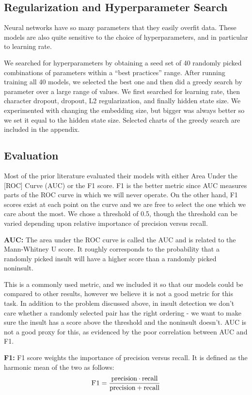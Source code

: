 \documentclass{article} %
\begin{document}
\subsection*{Regularization and Hyperparameter Search}
Neural networks have so many parameters that they easily overfit data. These models are also quite sensitive to the choice of hyperparameters, and in particular to learning rate. 

We searched for hyperparameters by obtaining a seed set of 40 randomly picked combinations of parameters within a ``best practices'' range. After running training all 40 models, we selected the best one and then did a greedy search by parameter over a large range of values. We first searched for learning rate, then character dropout, dropout, L2 regularization, and finally hidden state size. We experimented with changing the embedding size, but bigger was always better so we set it equal to the hidden state size. Selected charts of the greedy search are included in the appendix.


\subsection*{Evaluation}
Most of the prior literature evaluated their models with either Area Under the [ROC] Curve (AUC) or the F1 score. F1 is the better metric since AUC measures parts of the ROC curve in which we will never operate. On the other hand, F1 scores exist at each point on the curve and we are free to select the one which we care about the most. We chose a threshold of 0.5, though the threshold can be varied depending upon relative importance of precision versus recall. 

\textbf{AUC:}
The area under the ROC curve is called the AUC and is related to the Mann-Whitney U score. It roughly corresponds to the probability that a randomly picked insult will have a higher score than a randomly picked noninsult. 

This is a commonly used metric, and we included it so that our models could be compared to other results, however we believe it is not a good metric for this task. In addition to the problem discussed above, in insult detection we don't care whether a randomly selected pair has the right ordering - we want to make sure the insult has a score above the threshold and the noninsult doesn't. AUC is not a good proxy for this, as evidenced by the poor correlation between AUC and F1. 

\textbf{F1:}
F1 score weights the importance of precision versus recall.
It is defined as the harmonic mean of the two as follows:
$$ \textsc{F1} = \frac{\text{precision} \cdot \text{recall}}{\text{precision} + \text{recall}} $$
\end{document}
